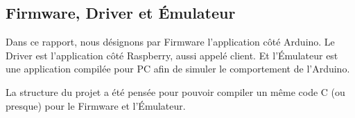 \subsection{Firmware, Driver et Émulateur}
Dans ce rapport, nous désignons par Firmware l'application côté Arduino. 
Le Driver est l'application côté Raspberry, aussi appelé client. Et l'Émulateur
est une application compilée pour PC afin de simuler le comportement de
l'Arduino.

La structure du projet a été pensée pour pouvoir compiler un même code C
(ou presque) pour le Firmware et l'Émulateur.
